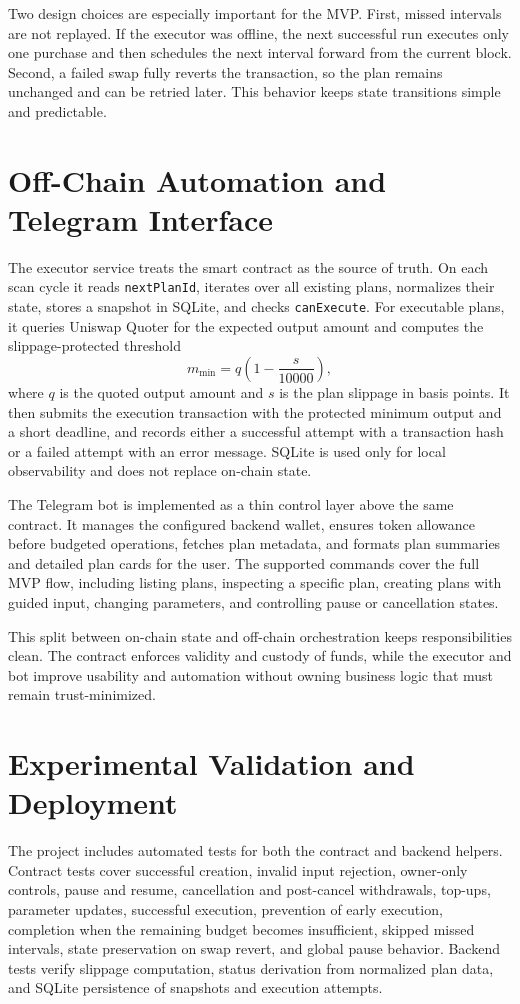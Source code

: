 \documentclass[conference]{IEEEtran}
\begin{document}
Two design choices are especially important for the MVP. First, missed intervals are not replayed. If the executor was offline, the next successful run executes only one purchase and then schedules the next interval forward from the current block. Second, a failed swap fully reverts the transaction, so the plan remains unchanged and can be retried later. This behavior keeps state transitions simple and predictable.

\section{Off-Chain Automation and Telegram Interface}
The executor service treats the smart contract as the source of truth. On each scan cycle it reads \texttt{nextPlanId}, iterates over all existing plans, normalizes their state, stores a snapshot in SQLite, and checks \texttt{canExecute}. For executable plans, it queries Uniswap Quoter for the expected output amount and computes the slippage-protected threshold
\begin{equation}
m_{\min} = q \left(1 - \frac{s}{10000}\right),
\end{equation}
where $q$ is the quoted output amount and $s$ is the plan slippage in basis points. It then submits the execution transaction with the protected minimum output and a short deadline, and records either a successful attempt with a transaction hash or a failed attempt with an error message. SQLite is used only for local observability and does not replace on-chain state.

The Telegram bot is implemented as a thin control layer above the same contract. It manages the configured backend wallet, ensures token allowance before budgeted operations, fetches plan metadata, and formats plan summaries and detailed plan cards for the user. The supported commands cover the full MVP flow, including listing plans, inspecting a specific plan, creating plans with guided input, changing parameters, and controlling pause or cancellation states.

This split between on-chain state and off-chain orchestration keeps responsibilities clean. The contract enforces validity and custody of funds, while the executor and bot improve usability and automation without owning business logic that must remain trust-minimized.

\section{Experimental Validation and Deployment}
The project includes automated tests for both the contract and backend helpers. Contract tests cover successful creation, invalid input rejection, owner-only controls, pause and resume, cancellation and post-cancel withdrawals, top-ups, parameter updates, successful execution, prevention of early execution, completion when the remaining budget becomes insufficient, skipped missed intervals, state preservation on swap revert, and global pause behavior. Backend tests verify slippage computation, status derivation from normalized plan data, and SQLite persistence of snapshots and execution attempts.
\end{document}
